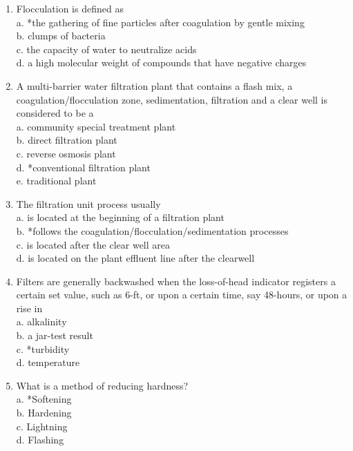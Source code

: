 \begin{enumerate}
  \item Flocculation is defined as\\
a. *the gathering of fine particles after coagulation by gentle mixing\\
b. clumps of bacteria\\
c. the capacity of water to neutralize acids\\
d. a high molecular weight of compounds that have negative charges\\

  \item A multi-barrier water filtration plant that contains a flash mix, a coagulation/flocculation zone, sedimentation, filtration and a clear well is considered to be a\\
a. community special treatment plant\\
b. direct filtration plant\\
c. reverse osmosis plant\\
d. *conventional filtration plant\\
e. traditional plant 

\item The filtration unit process usually\\
a. is located at the beginning of a filtration plant\\
b. *follows the coagulation/flocculation/sedimentation processes\\
c. is located after the clear well area\\
$\mathrm{d}$. is located on the plant effluent line after the clearwell\\

  \item Filters are generally backwashed when the loss-of-head indicator registers a certain set value, such as 6-ft, or upon a certain time, say 48-hours, or upon a rise in\\
a. alkalinity\\
b. a jar-test result\\
c. *turbidity\\
d. temperature\\

\item What is a method of reducing hardness?\\
a.  *Softening\\
b.  Hardening\\
c.  Lightning\\
d.  Flashing\\


\end{enumerate}
